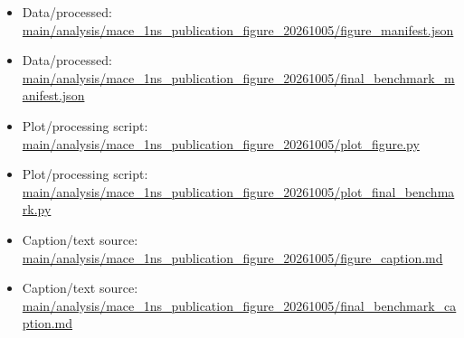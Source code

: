 \begin{itemize}[leftmargin=1.4em,noitemsep]
\item Data/processed: \begingroup\scriptsize\url{main/analysis/mace_1ns_publication_figure_20261005/figure_manifest.json}\endgroup
\item Data/processed: \begingroup\scriptsize\url{main/analysis/mace_1ns_publication_figure_20261005/final_benchmark_manifest.json}\endgroup
\item Plot/processing script: \begingroup\scriptsize\url{main/analysis/mace_1ns_publication_figure_20261005/plot_figure.py}\endgroup
\item Plot/processing script: \begingroup\scriptsize\url{main/analysis/mace_1ns_publication_figure_20261005/plot_final_benchmark.py}\endgroup
\item Caption/text source: \begingroup\scriptsize\url{main/analysis/mace_1ns_publication_figure_20261005/figure_caption.md}\endgroup
\item Caption/text source: \begingroup\scriptsize\url{main/analysis/mace_1ns_publication_figure_20261005/final_benchmark_caption.md}\endgroup
\end{itemize}
